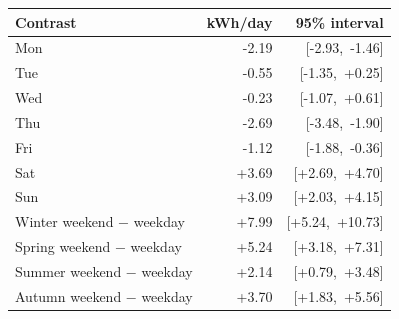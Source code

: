 \begin{tabular}{@{}lrr@{}}
\toprule
Contrast & kWh/day & 95\% interval \\
\midrule
Mon & -2.19 & [-2.93,\ -1.46] \\
Tue & -0.55 & [-1.35,\ +0.25] \\
Wed & -0.23 & [-1.07,\ +0.61] \\
Thu & -2.69 & [-3.48,\ -1.90] \\
Fri & -1.12 & [-1.88,\ -0.36] \\
Sat & +3.69 & [+2.69,\ +4.70] \\
Sun & +3.09 & [+2.03,\ +4.15] \\
\addlinespace
Winter weekend $-$ weekday & +7.99 & [+5.24,\ +10.73] \\
Spring weekend $-$ weekday & +5.24 & [+3.18,\ +7.31] \\
Summer weekend $-$ weekday & +2.14 & [+0.79,\ +3.48] \\
Autumn weekend $-$ weekday & +3.70 & [+1.83,\ +5.56] \\
\bottomrule
\end{tabular}
